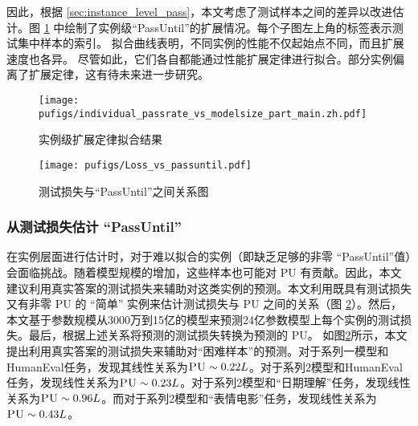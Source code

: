 因此，根据 \ref{sec:instance_level_pass}，本文考虑了测试样本之间的差异以改进估计。图 \ref{fig:idp_with_modelsize_part1} 中绘制了实例级“PassUntil”的扩展情况。每个子图左上角的标签表示测试集中样本的索引。
拟合曲线表明，不同实例的性能不仅起始点不同，而且扩展速度也各异。
尽管如此，它们各自都能通过性能扩展定律进行拟合。部分实例偏离了扩展定律，这有待未来进一步研究。 


\begin{figure}[htbp]
    \centering
    \texttt{[image: pufigs/individual\_passrate\_vs\_modelsize\_part\_main.zh.pdf]}
    \caption{实例级扩展定律拟合结果}
    \label{fig:idp_with_modelsize_part1}
\end{figure}

\begin{figure}[!htbp]
    \centering
    \texttt{[image: pufigs/Loss\_vs\_passuntil.pdf]}
    \caption{测试损失与“PassUntil”之间关系图}
\label{fig:loss_vs_passuntil}
\end{figure}

\subsubsection{从测试损失估计 “PassUntil”}

在实例层面进行估计时，对于难以拟合的实例（即缺乏足够的非零 “PassUntil”值）会面临挑战。随着模型规模的增加，这些样本也可能对 \textsc{PU} 有贡献。因此，本文建议利用真实答案的测试损失来辅助对这类实例的预测。本文利用既具有测试损失又有非零 \textsc{PU} 的 “简单” 实例来估计测试损失与 \textsc{PU} 之间的关系（图 \ref{fig:loss_vs_passuntil}）。然后，本文基于参数规模从3000万到15亿的模型来预测24亿参数模型上每个实例的测试损失。最后，根据上述关系将预测的测试损失转换为预测的 \textsc{PU}。
如图\ref{fig:loss_vs_passuntil}所示，本文提出利用真实答案的测试损失来辅助对“困难样本”的预测。对于系列一模型和HumanEval任务，发现其线性关系为\(\textsc{PU} \sim 0.22L\)。对于系列2模型和HumanEval任务，发现线性关系为\(\textsc{PU} \sim 0.23L\)。对于系列2模型和“日期理解”任务，发现线性关系为\(\textsc{PU} \sim 0.96L\)。而对于系列2模型和“表情电影”任务，发现线性关系为\(\textsc{PU} \sim 0.43L\)。 

